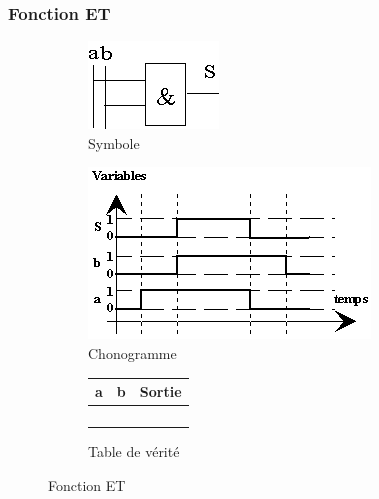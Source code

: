 \documentclass[10pt,fleqn]{article} %
\begin{document}
\subsubsection{Fonction ET}
\begin{figure}[ht]
  \begin{subfigure}{.2\textwidth}
    \includegraphics[width=\textwidth]{images/et_symb}
    \caption{Symbole}
    \centering
  \end{subfigure}
  \begin{subfigure}{.4\textwidth}
    \centering
    \includegraphics[width=\textwidth]{images/et_chrono}
    \caption{Chonogramme}
  \end{subfigure}
  \begin{subfigure}{.33\textwidth}
    \centering
    \begin{tabular}{|c|c|c|}
      \hline
      \textbf{a}&  \textbf{b}& \textbf{Sortie} \\
      \hline
       & & \\ \hline
       & & \\ \hline
       & & \\ \hline
       & & \\ \hline
    \end{tabular}
    \caption{Table de vérité}
  \end{subfigure}
  \caption{Fonction ET}
\end{figure}
\pagebreak
\end{document}
